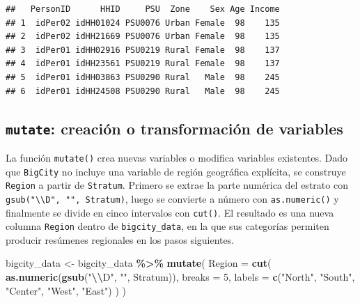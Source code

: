 \documentclass[
  spanish,
  12pt,
]{book}
\newenvironment{Shaded}{\begin{snugshade}}{\end{snugshade}}
\newcommand{\AttributeTok}[1]{\textcolor[rgb]{0.13,0.29,0.53}{#1}}
\newcommand{\DecValTok}[1]{\textcolor[rgb]{0.00,0.00,0.81}{#1}}
\newcommand{\FunctionTok}[1]{\textcolor[rgb]{0.13,0.29,0.53}{\textbf{#1}}}
\newcommand{\NormalTok}[1]{#1}
\newcommand{\OtherTok}[1]{\textcolor[rgb]{0.56,0.35,0.01}{#1}}
\newcommand{\SpecialCharTok}[1]{\textcolor[rgb]{0.81,0.36,0.00}{\textbf{#1}}}
\newcommand{\StringTok}[1]{\textcolor[rgb]{0.31,0.60,0.02}{#1}}
\begin{document}
\begin{verbatim}
##   PersonID      HHID     PSU  Zone    Sex Age Income
## 1  idPer02 idHH01024 PSU0076 Urban Female  98    135
## 2  idPer02 idHH21669 PSU0076 Urban Female  98    135
## 3  idPer01 idHH02916 PSU0219 Rural Female  98    137
## 4  idPer01 idHH23561 PSU0219 Rural Female  98    137
## 5  idPer01 idHH03863 PSU0290 Rural   Male  98    245
## 6  idPer01 idHH24508 PSU0290 Rural   Male  98    245
\end{verbatim}

\subsection{\texorpdfstring{\texttt{mutate}: creación o transformación de variables}{mutate: creación o transformación de variables}}\label{mutate-creacion-o-transformacion-de-variables}

La función \texttt{mutate()} crea nuevas variables o modifica variables existentes. Dado que \texttt{BigCity} no incluye una variable de región geográfica explícita, se construye \texttt{Region} a partir de \texttt{Stratum}. Primero se extrae la parte numérica del estrato con \texttt{gsub("\textbackslash{}\textbackslash{}D",\ "",\ Stratum)}, luego se convierte a número con \texttt{as.numeric()} y finalmente se divide en cinco intervalos con \texttt{cut()}. El resultado es una nueva columna \texttt{Region} dentro de \texttt{bigcity\_data}, en la que sus categorías permiten producir resúmenes regionales en los pasos siguientes.

\begin{Shaded}
\begin{Highlighting}[]
\NormalTok{bigcity\_data }\OtherTok{\textless{}{-}}\NormalTok{ bigcity\_data }\SpecialCharTok{\%\textgreater{}\%}
  \FunctionTok{mutate}\NormalTok{(}
    \AttributeTok{Region =} \FunctionTok{cut}\NormalTok{(}
      \FunctionTok{as.numeric}\NormalTok{(}\FunctionTok{gsub}\NormalTok{(}\StringTok{"}\SpecialCharTok{\textbackslash{}\textbackslash{}}\StringTok{D"}\NormalTok{, }\StringTok{""}\NormalTok{, Stratum)),}
      \AttributeTok{breaks =} \DecValTok{5}\NormalTok{,}
      \AttributeTok{labels =} \FunctionTok{c}\NormalTok{(}\StringTok{"North"}\NormalTok{, }\StringTok{"South"}\NormalTok{, }\StringTok{"Center"}\NormalTok{, }\StringTok{"West"}\NormalTok{, }\StringTok{"East"}\NormalTok{)}
\NormalTok{    )}
\NormalTok{  )}
\end{Highlighting}
\end{Shaded}
\end{document}
